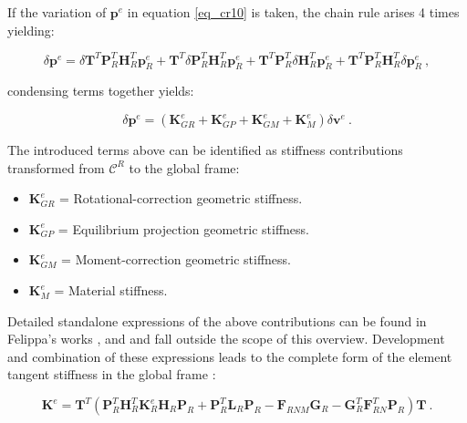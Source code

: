  If the variation of $\mathbf{p}^e$ in equation \ref{eq_cr10} is taken, the chain rule arises 4 times yielding:
 
  \begin{equation} 
 \delta \mathbf{p}^e
 =
\delta \mathbf{T}^T \mathbf{P}_R^T \mathbf{H}_R^T \mathbf{p}_R^e
+
\mathbf{T}^T \delta \mathbf{P}_R^T \mathbf{H}_R^T \mathbf{p}_R^e
+
\mathbf{T}^T \mathbf{P}_R^T \delta \mathbf{H}_R^T \mathbf{p}_R^e
+
\mathbf{T}^T\mathbf{P}_R^T \mathbf{H}_R^T  \delta \mathbf{p}_R^e
 \label{eq_cr12}\ ,
 \end{equation}
 
 condensing terms together yields:
 
   \begin{equation} 
 \delta \mathbf{p}^e
 =
(\mathbf{K}_{GR}^e + 
\mathbf{K}_{GP}^e + 
\mathbf{K}_{GM}^e + 
\mathbf{K}_{M}^e
)
\delta \mathbf{v}^e
 \label{eq_cr13}\ .
 \end{equation}
 
 The introduced terms above can be identified as stiffness contributions transformed from $\mathscr{C}^R$ to the global frame:
 
 \begin{itemize}
 	\item $\mathbf{K}_{GR}^e$ = Rotational-correction geometric stiffness.
 	\item $\mathbf{K}_{GP}^e$ = Equilibrium projection geometric stiffness.
 	\item $\mathbf{K}_{GM}^e$ = Moment-correction geometric stiffness.
 	\item $\mathbf{K}_{M}^e$ = Material stiffness.
 \end{itemize}
 
 Detailed standalone expressions of the above contributions can be found in Felippa's works \cite{felippa2005unified}, \cite{felippa2000systematic} and \cite{FelippaCR1_2016} and fall outside the scope of this overview. Development and combination of these expressions leads to the complete form of the element tangent stiffness in the global frame \cite{felippa2005unified}:
 
\begin{equation} 
\mathbf{K}^e 
 =
 \mathbf{T}^T
 (
 \mathbf{P}_R^T
 \mathbf{H}_R^T
 \mathbf{K}_R^e
  \mathbf{H}_R
   \mathbf{P}_R
+
 \mathbf{P}_R^T
  \mathbf{L}_R
\mathbf{P}_R
-
\mathbf{F}_{RNM}
 \mathbf{G}_R
 -
  \mathbf{G}_R^T
  \mathbf{F}_{RN}^T
\mathbf{P}_R
 )
\mathbf{T}
 \label{eq_cr14}\ .
 \end{equation}
 
